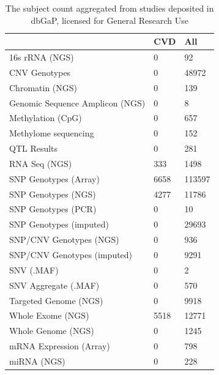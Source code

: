 \documentclass[letter]{bioinfo}
\begin{document}
\begin{table}[]
	\caption{The subject count aggregated from studies deposited in dbGaP, licensed for General Research Use}
	\label{tab:dbgapSubject}
	\begin{tabular}{l l l}
		\toprule
		& \textbf{CVD} &  \textbf{All}                         \\ \midrule
		16s rRNA (NGS)                 &     0 &      92 \\
		CNV Genotypes                  &     0 &   48972 \\
		Chromatin (NGS)                &     0 &     139 \\
		Genomic Sequence Amplicon (NGS)&     0 &       8 \\
		Methylation (CpG)              &     0 &     657 \\
		Methylome sequencing           &     0 &     152 \\
		QTL Results                    &     0 &     281 \\
		RNA Seq (NGS)                  &   333 &    1498 \\
		SNP Genotypes (Array)          &  6658 &  113597 \\
		SNP Genotypes (NGS)            &  4277 &   11786 \\
		SNP Genotypes (PCR)            &     0 &      10 \\
		SNP Genotypes (imputed)        &     0 &   29693 \\
		SNP/CNV Genotypes (NGS)        &     0 &     936 \\
		SNP/CNV Genotypes (imputed)    &     0 &    9291 \\
		SNV (.MAF)                     &     0 &       2 \\
		SNV Aggregate (.MAF)           &     0 &     570 \\
		Targeted Genome (NGS)          &     0 &    9918 \\
		Whole Exome (NGS)              &  5518 &   12771 \\
		Whole Genome (NGS)             &     0 &    1245 \\
		mRNA Expression (Array)        &     0 &     798 \\
		miRNA (NGS)                        & 0 &   228 \\ \hline
	\end{tabular}
\end{table}
\end{document}
